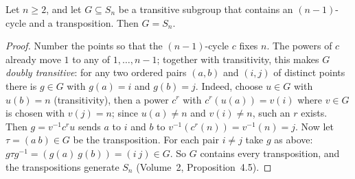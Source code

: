 \begin{lemma}\label{conjectures:lem:sngen}
Let $n\ge2$, and let $G\subseteq S_n$ be a transitive subgroup that contains an $(n-1)$-cycle and a transposition. Then $G=S_n$.
\end{lemma}
\begin{proof}
Number the points so that the $(n-1)$-cycle $c$ fixes $n$. The powers of $c$ already move $1$ to any of $1,\dots,n-1$; together with transitivity, this
makes $G$ \emph{doubly transitive}: for any two ordered pairs $(a,b)$ and $(i,j)$ of distinct points there is $g\in G$ with $g(a)=i$ and $g(b)=j$. Indeed,
choose $u\in G$ with $u(b)=n$ (transitivity), then a power $c^r$ with $c^r(u(a))=v(i)$ where $v\in G$ is chosen with $v(j)=n$; since $u(a)\ne n$ and
$v(i)\ne n$, such an $r$ exists. Then $g=v^{-1}c^ru$ sends $a$ to $i$ and $b$ to $v^{-1}(c^r(n))=v^{-1}(n)=j$. Now let $\tau=(a\ b)\in G$ be the
transposition. For each pair $i\ne j$ take $g$ as above: $g\tau g^{-1}=(g(a)\ g(b))=(i\ j)\in G$. So $G$ contains every transposition, and the
transpositions generate $S_n$ (Volume~2, Proposition~4.5).
\end{proof}

